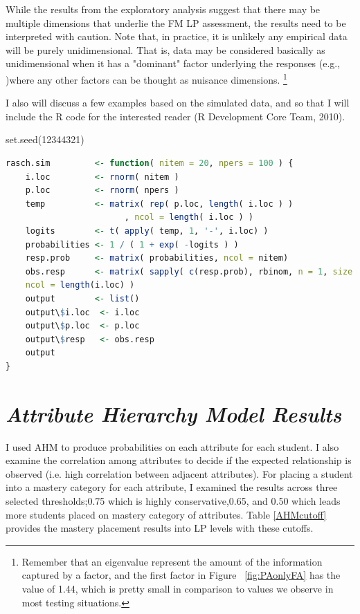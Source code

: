 While the results from the exploratory analysis suggest that there may be multiple dimensions that underlie the FM LP assessment, the results need to be interpreted with caution. Note that, in practice, it is unlikely any empirical data will be purely unidimensional. That is, data may be considered basically as unidimensional when it has a "dominant" factor underlying the responses (e.g., \cite{Lord,1980})where any other factors can be thought as nuisance dimensions.  \footnote{Remember that an eigenvalue represent the amount of the information captured by a factor, and the first factor in Figure ~\ref{fig:PAonlyFA} has the value of 1.44, which is pretty small in comparison to values we observe in most testing situations.} 


I also will discuss a few examples based on the simulated data, and so that I will include the R code for the interested reader (R Development Core Team, 2010).

set.seed(12344321)
\begin{lstlisting}[language=R]
	 rasch.sim         <- function( nitem = 20, npers = 100 ) {
    i.loc         <- rnorm( nitem )
    p.loc         <- rnorm( npers ) 
    temp          <- matrix( rep( p.loc, length( i.loc ) )
                        , ncol = length( i.loc ) )
    logits        <- t( apply( temp, 1, '-', i.loc) )
    probabilities <- 1 / ( 1 + exp( -logits ) )
    resp.prob     <- matrix( probabilities, ncol = nitem)
    obs.resp      <- matrix( sapply( c(resp.prob), rbinom, n = 1, size = 1), 		 
    ncol = length(i.loc) )
    output        <- list()
    output\$i.loc  <- i.loc
    output\$p.loc  <- p.loc
    output\$resp   <- obs.resp
    output
}
\end{lstlisting}

\section {\em Attribute Hierarchy Model Results}

I used AHM to produce probabilities on each attribute for each student. I also examine the correlation among attributes to decide if the expected relationship is observed (i.e. high correlation between adjacent attributes). For placing a student into a mastery category for each attribute, I examined the results across three selected thresholds;0.75 which is highly conservative,0.65, and 0.50 which leads more students placed on mastery category of attributes. Table \ref{AHMcutoff} provides the mastery placement results into LP levels with these cutoffs. 

